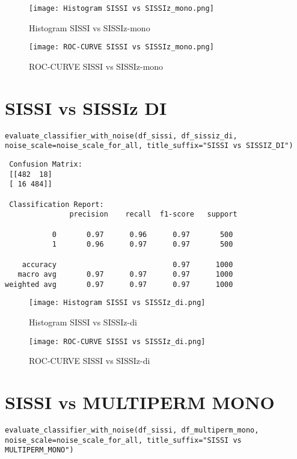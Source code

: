 \documentclass{article}
\begin{document}
\begin{large}
\begin{large}
\begin{large}
\begin{figure}[H]
    \centering
    \texttt{[image: Histogram SISSI vs SISSIz\_mono.png]}
    \caption{Histogram SISSI vs SISSIz-mono}
\end{figure}

\begin{figure}[H]
    \centering
    \texttt{[image: ROC-CURVE SISSI vs SISSIz\_mono.png]}
    \caption{ROC-CURVE SISSI vs SISSIz-mono}
\end{figure}

\clearpage

\section{SISSI vs SISSIz DI}
\begin{lstlisting}
evaluate_classifier_with_noise(df_sissi, df_sissiz_di, noise_scale=noise_scale_for_all, title_suffix="SISSI vs SISSIZ_DI")
\end{lstlisting}\par

\begin{lstlisting}
 Confusion Matrix:
 [[482  18]
 [ 16 484]]

 Classification Report:
               precision    recall  f1-score   support

           0       0.97      0.96      0.97       500
           1       0.96      0.97      0.97       500

    accuracy                           0.97      1000
   macro avg       0.97      0.97      0.97      1000
weighted avg       0.97      0.97      0.97      1000
\end{lstlisting}\par

\begin{figure}[H]
    \centering
    \texttt{[image: Histogram SISSI vs SISSIz\_di.png]}
    \caption{Histogram SISSI vs SISSIz-di}
\end{figure}

\begin{figure}[H]
    \centering
    \texttt{[image: ROC-CURVE SISSI vs SISSIz\_di.png]}
    \caption{ROC-CURVE SISSI vs SISSIz-di}
\end{figure}

\clearpage

\section{SISSI vs MULTIPERM MONO}
\begin{lstlisting}
evaluate_classifier_with_noise(df_sissi, df_multiperm_mono, noise_scale=noise_scale_for_all, title_suffix="SISSI vs MULTIPERM_MONO")



\end{lstlisting}
\end{large}
\end{large}
\end{large}
\end{document}
